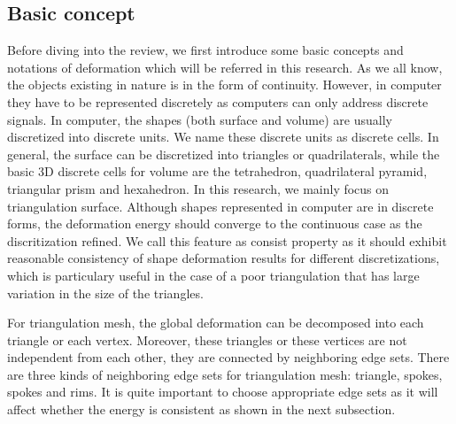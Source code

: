 \subsection{Basic concept}
Before diving into the review, we first introduce some basic concepts and notations of deformation which will be referred in this research. As we all know, the objects existing in nature is in the form of continuity. However, in computer they have to be represented discretely as computers can only address discrete signals. In computer, the shapes (both surface and volume) are usually discretized into discrete units. We name these discrete units as discrete cells. In general, the surface can be discretized into triangles or quadrilaterals, while the basic 3D discrete cells for volume are the tetrahedron, quadrilateral pyramid, triangular prism and hexahedron. In this research, we mainly focus on triangulation surface. Although shapes represented in computer are in discrete forms, the deformation energy should converge to the continuous case as the discritization refined. We call this feature as consist property as it should exhibit reasonable consistency of shape deformation results for different discretizations, which is particulary useful in the case of a poor triangulation that has large variation in the size of the triangles.

For triangulation mesh, the global deformation can be decomposed into each triangle or each vertex. Moreover, these triangles or these vertices are not independent from each other, they are connected by neighboring edge sets. There are three kinds of neighboring edge sets for triangulation mesh: triangle, spokes, spokes and rims. It is quite important to choose appropriate edge sets as it will affect whether the energy is consistent as shown in the next subsection.

